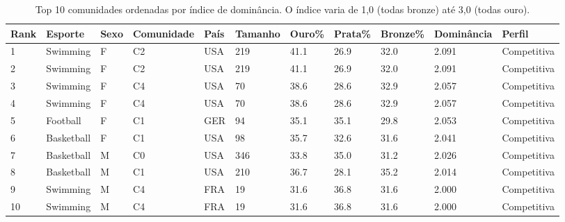 \begin{table}[htbp]
\centering
\caption{Top 10 comunidades ordenadas por índice de dominância. O índice varia de 1,0 (todas bronze) até 3,0 (todas ouro).}
\label{tab:top10_dominance}
\begin{tabular}{lllllllllll}
\hline
Rank & Esporte & Sexo & Comunidade & País & Tamanho & Ouro\% & Prata\% & Bronze\% & Dominância & Perfil \\
\hline
1 & Swimming & F & C2 & USA & 219 & 41.1 & 26.9 & 32.0 & 2.091 & Competitiva \\
2 & Swimming & F & C2 & USA & 219 & 41.1 & 26.9 & 32.0 & 2.091 & Competitiva \\
3 & Swimming & F & C4 & USA & 70 & 38.6 & 28.6 & 32.9 & 2.057 & Competitiva \\
4 & Swimming & F & C4 & USA & 70 & 38.6 & 28.6 & 32.9 & 2.057 & Competitiva \\
5 & Football & F & C1 & GER & 94 & 35.1 & 35.1 & 29.8 & 2.053 & Competitiva \\
6 & Basketball & F & C1 & USA & 98 & 35.7 & 32.6 & 31.6 & 2.041 & Competitiva \\
7 & Basketball & M & C0 & USA & 346 & 33.8 & 35.0 & 31.2 & 2.026 & Competitiva \\
8 & Basketball & M & C1 & USA & 210 & 36.7 & 28.1 & 35.2 & 2.014 & Competitiva \\
9 & Swimming & M & C4 & FRA & 19 & 31.6 & 36.8 & 31.6 & 2.000 & Competitiva \\
10 & Swimming & M & C4 & FRA & 19 & 31.6 & 36.8 & 31.6 & 2.000 & Competitiva \\
\hline
\end{tabular}
\end{table}

